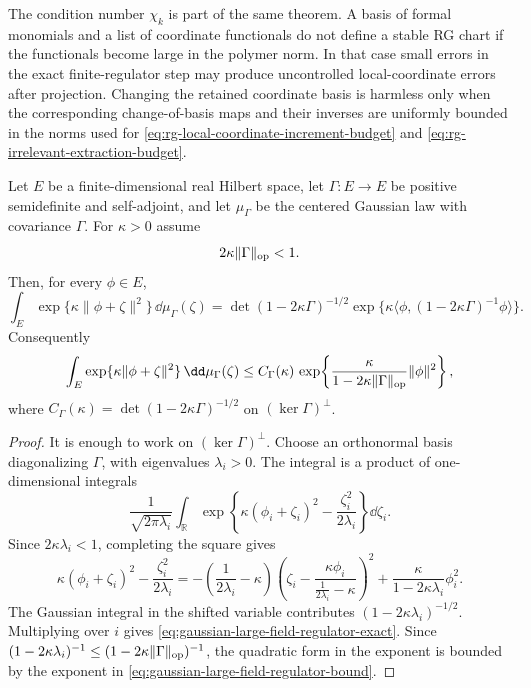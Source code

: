 The condition number \(\chi_k\) is part of the same theorem.  A basis of
formal monomials and a list of coordinate functionals do not define a stable
RG chart if the functionals become large in the polymer norm.  In that case
small errors in the exact finite-regulator step may produce uncontrolled
local-coordinate errors after projection.  Changing the retained coordinate
basis is harmless only when the corresponding change-of-basis maps and their
inverses are uniformly bounded in the norms used for
\eqref{eq:rg-local-coordinate-increment-budget} and
\eqref{eq:rg-irrelevant-extraction-budget}.

\begin{lemma}
\label{lem:finite-gaussian-large-field-regulator-stability}
Let \(E\) be a finite-dimensional real Hilbert space, let
\(\Gamma:E\to E\) be positive semidefinite and self-adjoint, and let
\(\mu_\Gamma\) be the centered Gaussian law with covariance \(\Gamma\).
For \(\kappa>0\) assume
\[
  2\kappa\|\Gamma\|_{\rm op}<1 .
\]
Then, for every \(\phi\in E\),
\begin{equation}
  \int_E
    \exp\{\kappa\|\phi+\zeta\|^2\}\,\dd\mu_\Gamma(\zeta)
  =
  \det(1-2\kappa\Gamma)^{-1/2}
  \exp\{\kappa\langle\phi,(1-2\kappa\Gamma)^{-1}\phi\rangle\}.
  \label{eq:gaussian-large-field-regulator-exact}
\end{equation}
Consequently
\begin{equation}
  \int_E
    \exp\{\kappa\|\phi+\zeta\|^2\}\,\dd\mu_\Gamma(\zeta)
  \leq
  C_\Gamma(\kappa)\,
  \exp\!\left\{
    \frac{\kappa}{1-2\kappa\|\Gamma\|_{\rm op}}\|\phi\|^2
  \right\},
  \label{eq:gaussian-large-field-regulator-bound}
\end{equation}
where \(C_\Gamma(\kappa)=\det(1-2\kappa\Gamma)^{-1/2}\) on
\((\ker\Gamma)^\perp\).
\end{lemma}

\begin{proof}
It is enough to work on \((\ker\Gamma)^\perp\).  Choose an orthonormal basis
diagonalizing \(\Gamma\), with eigenvalues \(\lambda_i>0\).  The integral is
a product of one-dimensional integrals
\[
  \frac{1}{\sqrt{2\pi\lambda_i}}
  \int_{\mathbb R}
    \exp\!\left\{
      \kappa(\phi_i+\zeta_i)^2-\frac{\zeta_i^2}{2\lambda_i}
    \right\}\dd\zeta_i .
\]
Since \(2\kappa\lambda_i<1\), completing the square gives
\[
  \kappa(\phi_i+\zeta_i)^2-\frac{\zeta_i^2}{2\lambda_i}
  =
  -\left(\frac{1}{2\lambda_i}-\kappa\right)
    \left(\zeta_i-\frac{\kappa\phi_i}
      {\frac{1}{2\lambda_i}-\kappa}\right)^2
  +
  \frac{\kappa}{1-2\kappa\lambda_i}\phi_i^2 .
\]
The Gaussian integral in the shifted variable contributes
\((1-2\kappa\lambda_i)^{-1/2}\).  Multiplying over \(i\) gives
\eqref{eq:gaussian-large-field-regulator-exact}.  Since
\((1-2\kappa\lambda_i)^{-1}\leq
(1-2\kappa\|\Gamma\|_{\rm op})^{-1}\), the quadratic form in the exponent is
bounded by the exponent in
\eqref{eq:gaussian-large-field-regulator-bound}.
\end{proof}


